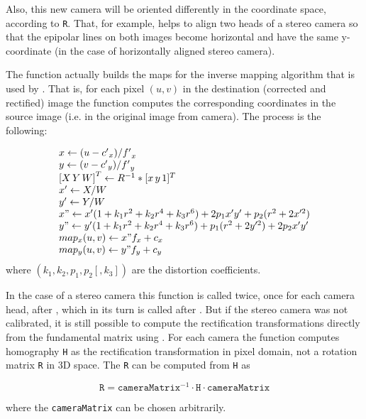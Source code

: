 Also, this new camera will be oriented differently in the coordinate space, according to \texttt{R}. That, for example, helps to align two heads of a stereo camera so that the epipolar lines on both images become horizontal and have the same y- coordinate (in the case of horizontally aligned stereo camera).

The function actually builds the maps for the inverse mapping algorithm that is used by . That is, for each pixel $(u, v)$ in the destination (corrected and rectified) image the function computes the corresponding coordinates in the source image (i.e. in the original image from camera). The process is the following:

\[
\begin{array}{l}
x \leftarrow (u - {c'}_x)/{f'}_x \\
y \leftarrow (v - {c'}_y)/{f'}_y \\
{[X\,Y\,W]}^T \leftarrow R^{-1}*[x\,y\,1]^T \\
x' \leftarrow X/W \\
y' \leftarrow Y/W \\
x" \leftarrow x' (1 + k_1 r^2 + k_2 r^4 + k_3 r^6) + 2p_1 x' y' + p_2(r^2 + 2 x'^2) \\
y" \leftarrow y' (1 + k_1 r^2 + k_2 r^4 + k_3 r^6) + p_1 (r^2 + 2 y'^2) + 2 p_2 x' y' \\
map_x(u,v) \leftarrow x" f_x + c_x \\
map_y(u,v) \leftarrow y" f_y + c_y
\end{array}
\]
where $(k_1, k_2, p_1, p_2[, k_3])$ are the distortion coefficients. 
 
In the case of a stereo camera this function is called twice, once for each camera head, after , which in its turn is called after . But if the stereo camera was not calibrated, it is still possible to compute the rectification transformations directly from the fundamental matrix using . For each camera the function computes homography \texttt{H} as the rectification transformation in pixel domain, not a rotation matrix \texttt{R} in 3D space. The \texttt{R} can be computed from \texttt{H} as 

\[ \texttt{R} = \texttt{cameraMatrix}^{-1} \cdot \texttt{H} \cdot \texttt{cameraMatrix} \]

where the \texttt{cameraMatrix} can be chosen arbitrarily.

